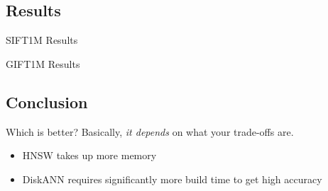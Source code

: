 \subsection{Results}

\begin{frame}{SIFT1M Results}
    
\end{frame}

\begin{frame}{GIFT1M Results}
    
\end{frame}

\subsection{Conclusion}

\begin{frame}{Which is better?}
    Basically, \textit{it depends} on what your trade-offs are.
    \begin{itemize}
        \item HNSW takes up more memory
        \item DiskANN requires significantly more build time to get high accuracy
    \end{itemize}
\end{frame}
